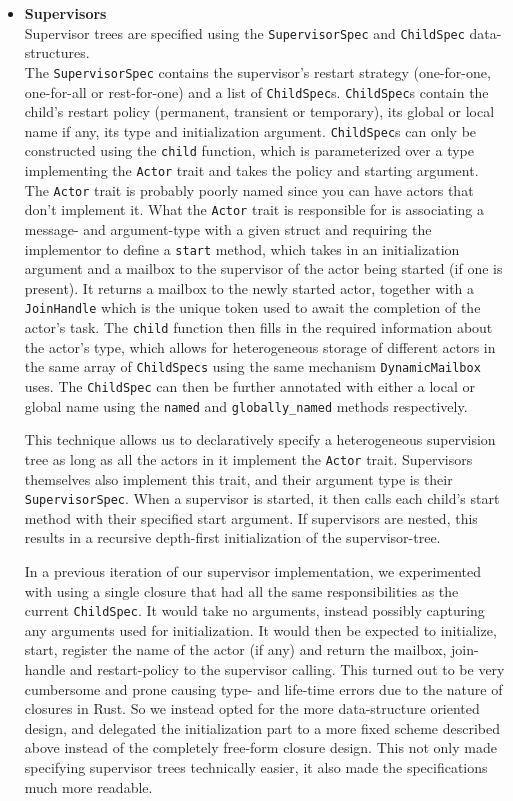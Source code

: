 \documentclass[a4paper]{article}
\begin{document}
\begin{itemize}
\item{\bf Supervisors} \\
Supervisor trees are specified using the \texttt{SupervisorSpec} and
\texttt{ChildSpec} data-structures. \\ The \texttt{SupervisorSpec} contains the
supervisor's restart strategy (one-for-one, one-for-all or rest-for-one) and a
list of \texttt{ChildSpec}s. \texttt{ChildSpec}s contain the child's restart
policy (permanent, transient or temporary), its global or local name if any,
its type and initialization argument. \texttt{ChildSpec}s can only be
constructed using the \texttt{child} function, which is parameterized over a type
implementing the \texttt{Actor} trait and takes the policy and starting
argument. The \texttt{Actor} trait is probably poorly named since you can have
actors that don't implement it. What the \texttt{Actor} trait is responsible for
is associating a message- and argument-type with a given struct and requiring
the implementor to define a \texttt{start} method, which takes in an
initialization argument and a mailbox to the supervisor of the actor being
started (if one is present). It returns a mailbox to the newly started actor,
together with a \texttt{JoinHandle} which is the unique token used to await the
completion of the actor's task. The \texttt{child} function then fills in the
required information about the actor's type, which allows for heterogeneous
storage of different actors in the same array of \texttt{ChildSpecs} using the
same mechanism \texttt{DynamicMailbox} uses. The \texttt{ChildSpec} can then be
further annotated with either a local or global name using the \texttt{named} and
\texttt{globally\_named} methods respectively.

This technique allows us to declaratively specify a heterogeneous supervision
tree as long as all the actors in it implement the \texttt{Actor} trait.
Supervisors themselves also implement this trait, and their argument type is
their \texttt{SupervisorSpec}. When a supervisor is started, it then calls each
child's start method with their specified start argument. If supervisors are
nested, this results in a recursive depth-first initialization of the
supervisor-tree.

In a previous iteration of our supervisor implementation, we experimented with
using a single closure that had all the same responsibilities as the current
\texttt{ChildSpec}. It would take no arguments, instead possibly capturing any
arguments used for initialization. It would then be expected to
initialize, start, register the name of the actor (if any) and return the
mailbox, join-handle and restart-policy to the supervisor calling. This turned
out to be very cumbersome and prone causing type- and life-time errors due to
the nature of closures in Rust. So we instead opted for the more data-structure
oriented design, and delegated the initialization part to a more fixed scheme
described above instead of the completely free-form closure design. This not
only made specifying supervisor trees technically easier, it also made the
specifications much more readable.


\end{itemize}
\end{document}
